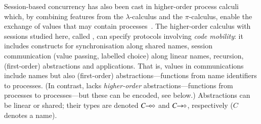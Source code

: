 \documentclass[preprint,11pt]{elsarticle}
\begin{document}
Session-based concurrency has also been cast in {higher-order} process
calculi which, by combining features from the $\lambda$-calculus and the $\pi$-calculus, 
enable the exchange of values 
that may contain processes~\cite{tlca07,DBLP:journals/jfp/GayV10}. 
The higher-order calculus with sessions studied here, called \HOp,
can specify protocols involving \emph{code mobility}: it includes
constructs for 
synchronisation along shared names, 
session communication (value passing, labelled choice) along linear names,
recursion, 
 (first-order) abstractions 
 and applications.
 That is, 
 values in communications include names but also (first-order) abstractions---functions from name identifiers to processes. 
 (In contrast, \HOp lacks \emph{higher-order} abstractions---functions from processes to processes---but these can be encoded, see below.)
Abstractions can be linear or shared; their types are  denoted $C\!\! \multimap\!\! \diamond$ and $C\!\! \rightarrow\!\! \diamond$, respectively ($C$ 
denotes a name). 

\end{document}

